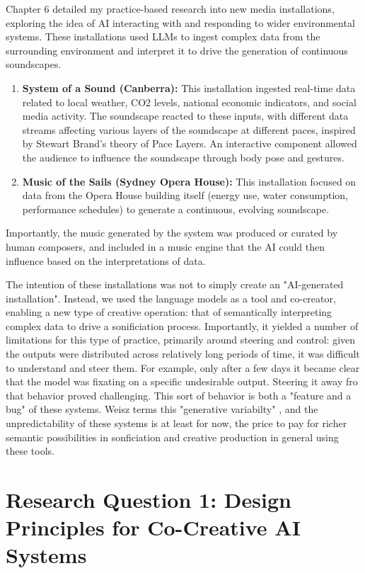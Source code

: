 Chapter 6 detailed my practice-based research into new media installations, exploring the idea of AI interacting with and responding to wider environmental systems. These installations used LLMs to ingest complex data from the surrounding environment and interpret it to drive the generation of continuous soundscapes.

\begin{enumerate}
    \item \textbf{System of a Sound (Canberra):} This installation ingested real-time data related to local weather, CO2 levels, national economic indicators, and social media activity. The soundscape reacted to these inputs, with different data streams affecting various layers of the soundscape at different paces, inspired by Stewart Brand's theory of Pace Layers. An interactive component allowed the audience to influence the soundscape through body pose and gestures.
    \item \textbf{Music of the Sails (Sydney Opera House):} This installation focused on data from the Opera House building itself (energy use, water consumption, performance schedules) to generate a continuous, evolving soundscape.
\end{enumerate}

Importantly, the music generated by the system was produced or curated by human composers, and included in a music engine that the AI could then influence based on the interpretations of data. 

The intention of these installations was not to simply create an "AI-generated installation". Instead, we used the language models as a tool and co-creator, enabling a new type of creative operation: that of semantically interpreting complex data to drive a sonificiation process. Importantly, it yielded a number of limitations for this type of practice, primarily around steering and control: given the outputs were distributed across relatively long periods of time, it was difficult to understand and steer them. For example, only after a few days it became clear that the model was fixating on a specific undesirable output. Steering it away fro that behavior proved challenging. This sort of behavior is both a "feature and a bug" of these systems. Weisz terms this "generative variabilty" \cite{Weisz2024-io}, and the unpredictability of these systems is at least for now, the price to pay for richer semantic possibilities in sonficiation and creative production in general using these tools. 


\section{Research Question 1: Design Principles for Co-Creative AI Systems}


